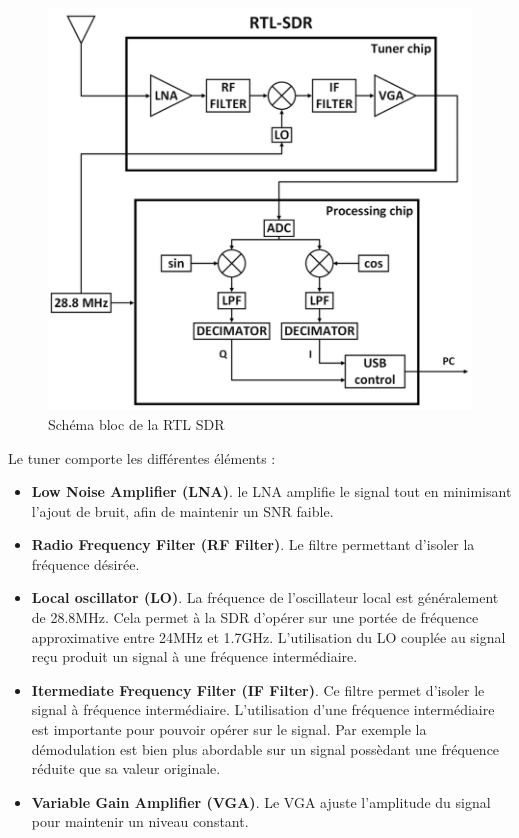 \newpage

\begin{figure}[h]
\centering

\includegraphics[scale=0.5]{images/SB-rtlsdr.png}
\caption{Schéma bloc de la RTL SDR\cite{SBrtlsdr}}\label{term3000}
\end{figure}


Le tuner comporte les différentes éléments :
\begin{itemize}
\item \textbf{Low Noise Amplifier (LNA)}. le LNA amplifie le signal tout en minimisant l'ajout de bruit, afin de maintenir un SNR faible.
\item \textbf{Radio Frequency Filter (RF Filter)}. Le filtre permettant d'isoler la fréquence désirée.
\item \textbf{Local oscillator (LO)}. La fréquence de l'oscillateur local est généralement de 28.8MHz. Cela permet à la SDR d'opérer sur une portée de fréquence approximative entre 24MHz et 1.7GHz. L'utilisation du LO couplée au signal reçu produit un signal à une fréquence intermédiaire.
\item \textbf{Itermediate Frequency Filter (IF Filter)}. Ce filtre permet d'isoler le signal à fréquence intermédiaire. L'utilisation d'une fréquence intermédiaire est importante pour pouvoir opérer sur le signal. Par exemple la démodulation est bien plus abordable sur un signal possèdant une fréquence réduite que sa valeur originale.
\item \textbf{Variable Gain Amplifier (VGA)}. Le VGA ajuste l'amplitude du signal pour maintenir un niveau constant.
\end{itemize}

